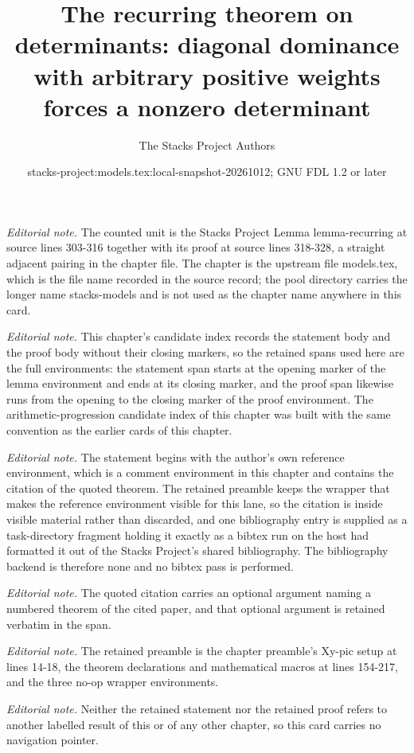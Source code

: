 \documentclass[10pt,a4paper]{amsart}
\title{The recurring theorem on determinants: diagonal dominance with arbitrary positive weights forces a nonzero determinant}
\author{The Stacks Project Authors}
\date{stacks-project:models.tex:local-snapshot-20261012; GNU FDL 1.2 or later}
\theoremstyle{plain}
\theoremstyle{definition}
\theoremstyle{remark}
\numberwithin{equation}{subsection}
\begin{document}
\maketitle
\noindent\textit{Editorial note.} The counted unit is the Stacks Project Lemma lemma-recurring at source lines 303-316 together with its proof at source lines 318-328, a straight adjacent pairing in the chapter file. The chapter is the upstream file models.tex, which is the file name recorded in the source record; the pool directory carries the longer name stacks-models and is not used as the chapter name anywhere in this card.\par\medskip
\noindent\textit{Editorial note.} This chapter's candidate index records the statement body and the proof body without their closing markers, so the retained spans used here are the full environments: the statement span starts at the opening marker of the lemma environment and ends at its closing marker, and the proof span likewise runs from the opening to the closing marker of the proof environment. The arithmetic-progression candidate index of this chapter was built with the same convention as the earlier cards of this chapter.\par\medskip
\noindent\textit{Editorial note.} The statement begins with the author's own reference environment, which is a comment environment in this chapter and contains the citation of the quoted theorem. The retained preamble keeps the wrapper that makes the reference environment visible for this lane, so the citation is inside visible material rather than discarded, and one bibliography entry is supplied as a task-directory fragment holding it exactly as a bibtex run on the host had formatted it out of the Stacks Project's shared bibliography. The bibliography backend is therefore none and no bibtex pass is performed.\par\medskip
\noindent\textit{Editorial note.} The quoted citation carries an optional argument naming a numbered theorem of the cited paper, and that optional argument is retained verbatim in the span.\par\medskip
\noindent\textit{Editorial note.} The retained preamble is the chapter preamble's Xy-pic setup at lines 14-18, the theorem declarations and mathematical macros at lines 154-217, and the three no-op wrapper environments.\par\medskip
\noindent\textit{Editorial note.} Neither the retained statement nor the retained proof refers to another labelled result of this or of any other chapter, so this card carries no navigation pointer.\par\medskip
\end{document}
